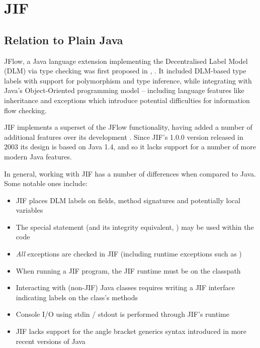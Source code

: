 \section{JIF}

\subsection{Relation to Plain Java}

JFlow, a Java language extension implementing the Decentralised Label Model (DLM) via type checking was first proposed in , \cite{myers1999jflow}. It included DLM-based type labels with support for polymorphism and type inference, while integrating with Java's Object-Oriented programming model -- including language features like inheritance and exceptions which introduce potential difficulties for information flow checking.

JIF implements a superset of the JFlow functionality, having added a number of additional features over its development \cite{jifwebsite}. Since JIF's 1.0.0 version released in 2003 its design is based on Java 1.4, and so it lacks support for a number of more modern Java features.

In general, working with JIF has a number of differences when compared to Java. Some notable ones include:

\begin{itemize}
	\item JIF places DLM labels on fields, method signatures and potentially local variables
	
	\item The special  statement (and its integrity equivalent, ) may be used within the code
	
	\item \textit{All} exceptions are checked in JIF (including runtime exceptions such as )
	
	\item When running a JIF program, the JIF runtime must be on the classpath
	
	\item Interacting with (non-JIF) Java classes requires writing a JIF interface indicating labels on the class's methods
	
	\item Console I/O using stdin / stdout is performed through JIF's runtime
	
	\item JIF lacks support for the angle bracket generics syntax introduced in more recent versions of Java
\end{itemize}

